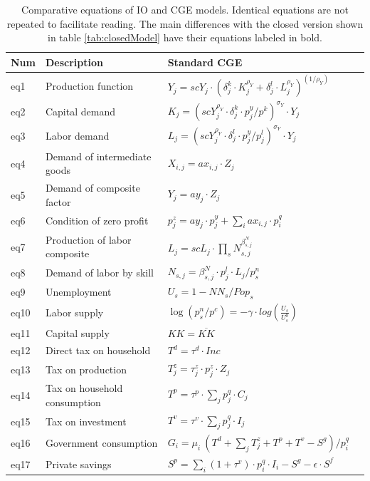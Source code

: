 


\begin{table}[!h]
	\centering
	\caption{Comparative equations of IO and CGE models. Identical equations are not repeated to facilitate reading. The main differences with the closed version shown in table \ref{tab:closedModel} have their equations labeled in bold.}
	\label{tab:fullModel}
	\begin{tabular}{llll}
		\toprule
		Num & Description & Standard CGE  \\
		\midrule
		eq1 & Production function & $Y_j    = scY_j \cdot  ( \delta^k_j \cdot K_j^{\rho_Y} + \delta^l_j \cdot L_j^{\rho_Y} )^(1/\rho_Y)$ \\
		eq2 & Capital demand & $ K_j = (scY_j^{\rho_Y} \cdot  \delta^k_j \cdot  p^y_j / p^k )^{\sigma_Y} \cdot  Y_j $ \\
		eq3 & Labor demand  & $L_j = (scY_j^{\rho_Y} \cdot \delta^l_j \cdot  p^y_j / p^l_j )^{\sigma_Y} \cdot Y_j $ \\	
		eq4 & Demand of intermediate goods & $X_{i,j}  = ax_{i,j} \cdot Z_j$ \\
		eq5 & Demand of composite factor & $Y_j    = ay_j \cdot Z_j$ \\
		eq6 & Condition of zero profit & $p^z_j   = ay_j \cdot p^y_j + \sum_i ax_{i,j} \cdot p^q_i$ \\
		eq7 & Production of labor composite & $L_j    = scL_j \cdot  \prod_s N_{s,j}^{\beta^N_{s,j}}$  \\
		eq8 & Demand of labor by skill & $N_{s,j}  = \beta^N_{s,j} \cdot p^l_j \cdot  L_j / p^n_s$ \\
		eq9 & Unemployment & $ U_s =  1 - NN_s/Pop_s $\\
		eq10 & Labor supply & $\log( p^n_s / p^c ) = - \gamma \cdot  log(\frac{U_s}{U^0_s}) $  \\
		eq11 & Capital supply & $KK = \overline{KK} $  \\
		\midrule
		eq12 & Direct tax on household & $T^d = \tau^d \cdot Inc $\\
		eq13 & Tax on production & $T^z_j = \tau^z_j \cdot p^z_j \cdot Z_j$ \\
		eq14 & Tax on household consumption & $T^p = \tau^p \cdot \sum_j  p^q_j \cdot C_j $ \\
		eq15 & Tax on investment & $T^v = \tau^v \cdot \sum_j p^q_j\cdot I_j $ \\
		eq16 & Government consumption & $G_i = \mu_i ~ ( T^d + \sum_j T^z_j + T^p + T^v - S^g ) / p^q_i$ \\
		\midrule
		eq17 & Private savings & $S^p = \sum_i (1+\tau^v) \cdot p^q_i \cdot I_i - S^g - \epsilon \cdot S^f$ \\

\end{tabular}
\end{table}
